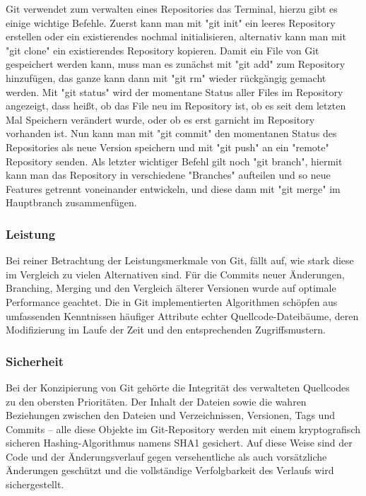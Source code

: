 Git verwendet zum verwalten eines Repositories das Terminal, hierzu gibt es einige wichtige Befehle. Zuerst kann man mit "git init" ein leeres Repository erstellen 
oder ein existierendes nochmal initialisieren, alternativ kann man mit "git clone" ein existierendes Repository kopieren. Damit ein File von Git gespeichert werden
kann, muss man es zunächst mit "git add" zum Repository hinzufügen, das ganze kann dann mit "git rm" wieder rückgängig gemacht werden. Mit "git status" wird der 
momentane Status aller Files im Repository angezeigt, dass heißt, ob das File neu im Repository ist, ob es seit dem letzten Mal Speichern verändert wurde, oder ob es 
erst garnicht im Repository vorhanden ist. Nun kann man mit "git commit" den momentanen Status des Repositories als neue Version speichern und mit "git push" an ein "remote" 
Repository senden. Als letzter wichtiger Befehl gilt noch "git branch", hiermit kann man das Repository in verschiedene "Branches" aufteilen und so 
neue Features getrennt voneinander entwickeln, und diese dann mit "git merge" im Hauptbranch zusammenfügen.
\cite{sysarch-git-2}

\subsubsection{Leistung}

Bei reiner Betrachtung der Leistungsmerkmale von Git, fällt auf, wie stark diese im Vergleich zu vielen Alternativen sind. Für die Commits neuer 
Änderungen, Branching, Merging und den Vergleich älterer Versionen wurde auf optimale Performance geachtet. Die in Git implementierten Algorithmen schöpfen 
aus umfassenden Kenntnissen häufiger Attribute echter Quellcode-Dateibäume, deren Modifizierung im Laufe der Zeit und den entsprechenden Zugriffsmustern.
\cite{sysarch-git-1}

\subsubsection{Sicherheit}

Bei der Konzipierung von Git gehörte die Integrität des verwalteten Quellcodes zu den obersten Prioritäten. Der Inhalt der Dateien sowie die wahren Beziehungen 
zwischen den Dateien und Verzeichnissen, Versionen, Tags und Commits – alle diese Objekte im Git-Repository werden mit einem kryptografisch sicheren Hashing-Algorithmus namens SHA1 gesichert. 
Auf diese Weise sind der Code und der Änderungsverlauf gegen versehentliche als auch vorsätzliche Änderungen geschützt und die vollständige Verfolgbarkeit des Verlaufs wird sichergestellt.
\cite{sysarch-git-1}

